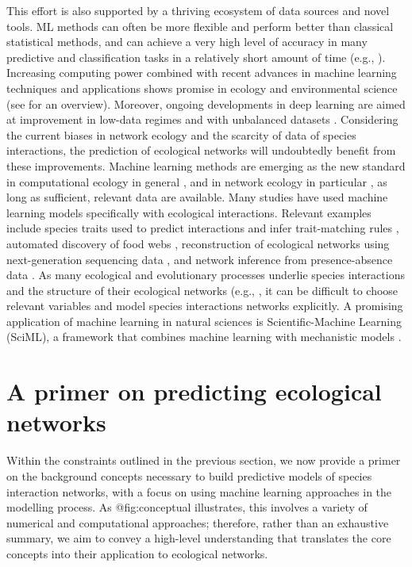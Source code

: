 This effort is also supported by a thriving ecosystem of data sources
and novel tools. ML methods can often be more flexible and perform
better than classical statistical methods, and can achieve a very high
level of accuracy in many predictive and classification tasks in a
relatively short amount of time (e.g., \cite{Cutler2007RanFor,
Krizhevsky2017ImaCla}). Increasing computing power combined with
recent advances in machine learning techniques and applications shows
promise in ecology and environmental science (see \cite{Christin2019AppDee}
for an overview). Moreover, ongoing developments in deep learning are
aimed at improvement in low-data regimes and with unbalanced datasets
\cite{Antoniou2018DatAug, Chawla2010DatMin}. Considering the current
biases in network ecology \cite{Poisot2021GloKno} and the scarcity of
data of species interactions, the prediction of ecological networks will
undoubtedly benefit from these improvements. Machine learning methods
are emerging as the new standard in computational ecology in general
\cite{Olden2008MacLea, Christin2019AppDee}, and in network ecology in
particular \cite{Bohan2017NexGlo}, as long as sufficient, relevant data
are available. Many studies have used machine learning models
specifically with ecological interactions. Relevant examples include
species traits used to predict interactions and infer trait-matching
rules \cite{Desjardins-Proulx2017EcoInt, Pichler2020MacLea}, automated
discovery of food webs \cite{Bohan2011AutDis}, reconstruction of
ecological networks using next-generation sequencing data
\cite{Bohan2017NexGlo}, and network inference from presence-absence data
\cite{Sander2017EcoNet}. As many ecological and evolutionary processes
underlie species interactions and the structure of their ecological
networks (e.g., \cite{Vazquez2009UniPat, Segar2020RolEvo}, it can be
difficult to choose relevant variables and model species interactions
networks explicitly. A promising application of machine learning in
natural sciences is Scientific-Machine Learning (SciML), a framework
that combines machine learning with mechanistic models
\cite{Chuang2018AdvCon, Rackauckas2020UniDif}.

\section{A primer on predicting ecological
networks}\label{a-primer-on-predicting-ecological-networks}

Within the constraints outlined in the previous section, we now provide
a primer on the background concepts necessary to build predictive models
of species interaction networks, with a focus on using machine learning
approaches in the modelling process. As @fig:conceptual illustrates,
this involves a variety of numerical and computational approaches;
therefore, rather than an exhaustive summary, we aim to convey a
high-level understanding that translates the core concepts into their
application to ecological networks.

